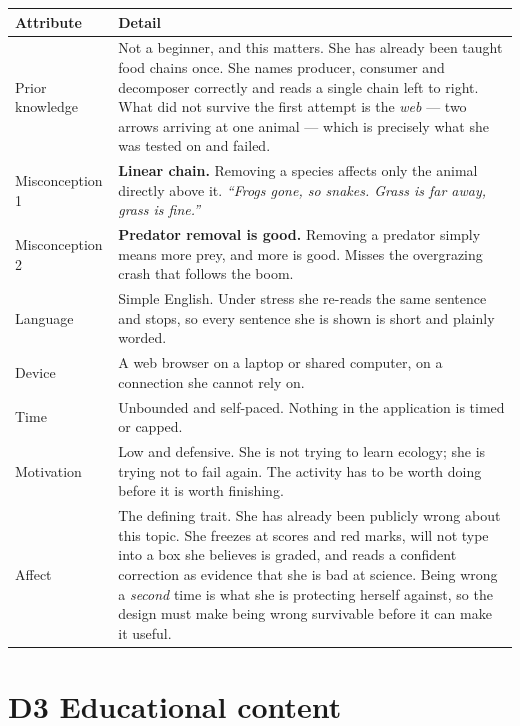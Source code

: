 \documentclass[11pt,a4paper]{article}
\begin{document}
\begin{longtable}{@{}p{3.3cm}p{12.3cm}@{}}
\toprule
\textbf{Attribute} & \textbf{Detail}\\
\midrule
\endhead
Prior knowledge &
Not a beginner, and this matters. She has already been taught food chains once. She names
producer, consumer and decomposer correctly and reads a single chain left to right. What did not
survive the first attempt is the \emph{web} --- two arrows arriving at one animal --- which is
precisely what she was tested on and failed.\\
\addlinespace
Misconception 1 &
\textbf{Linear chain.} Removing a species affects only the animal directly above it.
\textit{``Frogs gone, so snakes. Grass is far away, grass is fine.''}\\
\addlinespace
Misconception 2 &
\textbf{Predator removal is good.} Removing a predator simply means more prey, and more is good.
Misses the overgrazing crash that follows the boom.\\
\addlinespace
Language &
Simple English. Under stress she re-reads the same sentence and stops, so every sentence she is
shown is short and plainly worded.\\
\addlinespace
Device &
A web browser on a laptop or shared computer, on a connection she cannot rely on.\\
\addlinespace
Time &
Unbounded and self-paced. Nothing in the application is timed or capped.\\
\addlinespace
Motivation &
Low and defensive. She is not trying to learn ecology; she is trying not to fail again. The
activity has to be worth doing before it is worth finishing.\\
\addlinespace
Affect &
The defining trait. She has already been publicly wrong about this topic. She freezes at scores
and red marks, will not type into a box she believes is graded, and reads a confident correction
as evidence that she is bad at science. Being wrong a \emph{second} time is what she is
protecting herself against, so the design must make being wrong survivable before it can make it
useful.\\
\bottomrule
\end{longtable}

\section{D3 \quad Educational content}
\end{document}
